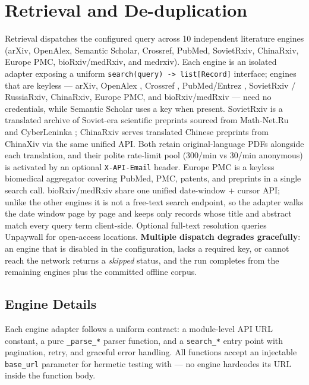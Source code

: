 \documentclass[
  english,
]{article}
\begin{document}
\newpage

\section{Retrieval and
De-duplication}\label{retrieval-and-de-duplication}

Retrieval dispatches the configured query across 10 independent
literature engines (arXiv, OpenAlex, Semantic Scholar, Crossref, PubMed,
SovietRxiv, ChinaRxiv, Europe PMC, bioRxiv/medRxiv, and medrxiv). Each
engine is an isolated adapter exposing a uniform
\texttt{search(query)\ -\textgreater{}\ list{[}Record{]}} interface;
engines that are keyless --- arXiv, OpenAlex \citep{priem2022openalex},
Crossref \citep{hendricks2020crossref}, PubMed/Entrez
\citep{sayers2022entrez}, SovietRxiv / RussiaRxiv, ChinaRxiv, Europe
PMC, and bioRxiv/medRxiv --- need no credentials, while Semantic Scholar
\citep{kinney2023semantic} uses a key when present. SovietRxiv is a
translated archive of Soviet-era scientific preprints sourced from
Math-Net.Ru and CyberLeninka \citep{sovietrxiv}; ChinaRxiv serves
translated Chinese preprints from ChinaXiv via the same unified API.
Both retain original-language PDFs alongside each translation, and their
polite rate-limit pool (300/min vs 30/min anonymous) is activated by an
optional \texttt{X-API-Email} header. Europe PMC is a keyless biomedical
aggregator covering PubMed, PMC, patents, and preprints in a single
search call. bioRxiv/medRxiv share one unified date-window + cursor API;
unlike the other engines it is not a free-text search endpoint, so the
adapter walks the date window page by page and keeps only records whose
title and abstract match every query term client-side. Optional
full-text resolution queries Unpaywall \citep{piwowar2018state} for
open-access locations. \textbf{Multiple dispatch degrades gracefully}:
an engine that is disabled in the configuration, lacks a required key,
or cannot reach the network returns a \emph{skipped} status, and the run
completes from the remaining engines plus the committed offline corpus.

\subsection{Engine Details}\label{engine-details}

Each engine adapter follows a uniform contract: a module-level API URL
constant, a pure \texttt{\_parse\_*} parser function, and a
\texttt{search\_*} entry point with pagination, retry, and graceful
error handling. All functions accept an injectable \texttt{base\_url}
parameter for hermetic testing with  --- no
engine hardcodes its URL inside the function body.
\end{document}

